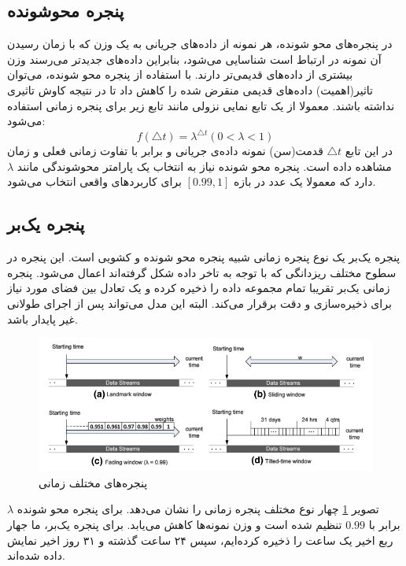 \subsection{پنجره محوشونده}
در پنجره‌های محو شونده، هر نمونه از داده‌های جریانی به یک وزن که با زمان رسیدن آن نمونه در ارتباط است شناسایی می‌شود، بنابراین داده‌های جدیدتر می‌رسند وزن بیشتری از داده‌های قدیمی‌تر دارند. با استفاده از پنجره محو شونده، می‌توان تاثیر(اهمیت) داده‌های قدیمی منقرض شده را کاهش داد تا در نتیجه کاوش تاثیری نداشته باشند. معمولا از یک تابع نمایی نزولی مانند تابع زیر برای پنجره زمانی استفاده می‌شود:
\begin{equation}
f(\triangle t) = \lambda^{\triangle t}(0 < \lambda < 1)
\end{equation}
در این تابع $\triangle t$ قدمت(سن) نمونه داده‌ی جریانی و برابر با تفاوت زمانی فعلی و زمان مشاهده داده است. پنجره محو شونده نیاز به انتخاب یک پارامتر محوشوندگی مانند $ \lambda $ دارد که معمولا یک عدد در بازه $ [0.99, 1] $ برای کاربردهای واقعی انتخاب می‌شود.

\subsection{پنجره یک‌بر}
پنجره یک‌بر یک نوع پنجره زمانی شبیه پنجره محو شونده و کشویی است. این پنجره در سطوح مختلف ریزدانگی که با توجه به تاخر داده شکل گرفته‌اند اعمال می‌شود. پنجره زمانی‌ یک‌بر تقریبا تمام مجموعه داده را ذخیره کرده و یک تعادل بین فضای مورد نیاز برای ذخیره‌سازی و دقت برقرار می‌کند. البته این‌ مدل می‌تواند پس از اجرای طولانی غیر پایدار باشد.

\begin{figure}%
\centerline{\includegraphics[width=15cm]{time-windows}}
\caption{پنجره‌های مختلف زمانی}
\label{fig:time-windows}
\end{figure}
تصویر
\ref{fig:time-windows}
چهار نوع مختلف پنجره زمانی را نشان می‌دهد. برای پنجره محو شونده $\lambda$ برابر با $0.99$ تنظیم شده است و وزن نمونه‌ها کاهش می‌یابد. برای پنجره یک‌بر، ما جهار ربع اخیر یک ساعت را ذخیره کرده‌ایم، سپس ۲۴ ساعت گذشته و ۳۱ روز اخیر نمایش داده شده‌اند.




